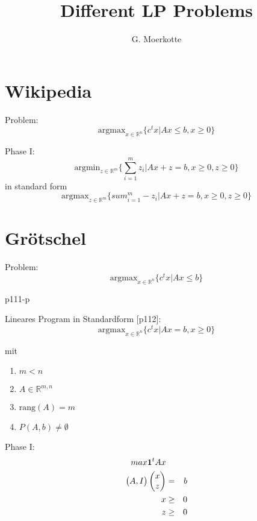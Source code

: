 \documentclass[11pt]{article}
\author{G. Moerkotte}
\title{Different LP Problems}
\newcommand{\R}{\mathbb{R}}
\newcommand{\argmax}{\text{argmax}}
\newcommand{\argmin}{\text{argmin}}
\newcommand{\rang}{\text{rang}}
\begin{document}
\maketitle
\tableofcontents


\section{Wikipedia}

Problem:
$$
  \argmax_{x \in \R^n} \{ c^t x | Ax \leq b, x \geq 0\}
$$

Phase I:
$$
 \argmin_{z \in \R^m} \{ \sum_{i=1}^{m} z_i | Ax + z = b, x \geq 0, z \geq 0 \}
$$
in standard form
$$
  \argmax_{z \in \R^m} \{ sum_{i=1}^{m} -z_i | Ax + z = b, x \geq 0, z \geq 0 \}
$$

\section{Gr\"otschel}

Problem:
$$
  \argmax_{x \in \R^n} \{ c^tx | Ax \leq b \}
$$

p111-p

Lineares Program in Standardform [p112]:
$$
 \argmax_{x \in \R^n} \{ c^tx | Ax = b, x \geq 0\}
$$

mit
\begin{enumerate}
\item $m < n$
\item $A \in \R^{m,n}$
\item $\rang(A) = m$
\item $P(A,b) \neq \emptyset $
\end{enumerate}


Phase I:
\begin{eqnarray*}
max {\bf 1}^t Ax & & \\
\begin{pmatrix} A, I \end{pmatrix} \begin{pmatrix} x \\ z \end{pmatrix} &=& b \\
   x &\geq& 0 \\
   z &\geq& 0
\end{eqnarray*}
\end{document}
